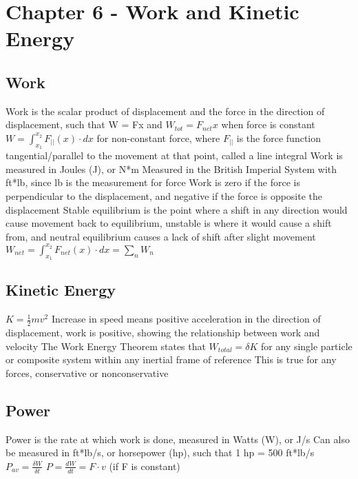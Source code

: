 \documentclass[11 pt, twoside]{article}
\newenvironment{outline*}
{
	\begin{outline}[enumerate]
	}
	{\end{outline}
}
\begin{document}
\section{Chapter 6 - Work and Kinetic Energy}
\subsection{Work}
\begin{outline*}
\1 Work is the scalar product of displacement and the force in the direction of displacement, such that W = Fx and $W_{tot} = F_{net}x$ when force is constant
\2 $W = \int^{x_2}_{x_1} F_{||}(x) \cdot dx$ for non-constant force, where $F_{||}$ is the force function tangential/parallel to the movement at that point, called a line integral
\2 Work is measured in Joules (J), or N*m
\2 Measured in the British Imperial System with ft*lb, since lb is the measurement for force
\1 Work is zero if the force is perpendicular to the displacement, and negative if the force is opposite the displacement
\1 Stable equilibrium is the point where a shift in any direction would cause movement back to equilibrium, unstable is where it would cause a shift from, and neutral equilibrium causes a lack of shift after slight movement
\1 $W_{net} = \int^{x_2}_{x_1} F_{net}(x) \cdot dx = \sum_n W_n$
\end{outline*}
\subsection{Kinetic Energy}
\begin{outline*}
\1 $K = \frac{1}{2}mv^2$
\1 Increase in speed means positive acceleration in the direction of displacement, work is positive, showing the relationship between work and velocity
\1 The Work Energy Theorem states that $W_{total} = \delta K$ for any single particle or composite system within any inertial frame of reference
\2 This is true for any forces, conservative or nonconservative
\end{outline*}
\subsection{Power}
\begin{outline*}
\1 Power is the rate at which work is done, measured in Watts (W), or J/s
\2 Can also be measured in ft*lb/s, or horsepower (hp), such that 1 hp = 500 ft*lb/s
\1 $P_{av} = \frac{\delta W}{\delta t}$
\1 $P = \frac{dW}{dt} = F \cdot v$ (if F is constant)
\end{outline*}
\end{document}
